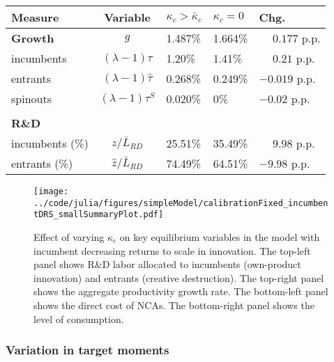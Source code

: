 \documentclass[ecta,nameyear,final]{econsocart}
\theoremstyle{definition}
\begin{document}
\begin{table}[]
	\centering
	\label{reducing_kappa_c_decomposition_table_incumbentRDS}
	\begin{tabular}{lclll}
		\toprule \toprule
		Measure & Variable & $\kappa_c > \bar{\kappa}_c$ & $\kappa_c = 0$ & Chg. \tabularnewline
		\midrule
		\textbf{Growth} & $g$ & 1.487\% & 1.664\% & $\phantom{-}0.177$ p.p.\tabularnewline
		\multicolumn{1}{l}{\quad incumbents} & $(\lambda -1) \tau$  & 1.20\% & 1.41\% & $\phantom{-}0.21$ p.p. \tabularnewline
		\multicolumn{1}{l}{\quad entrants} & $(\lambda -1) \hat{\tau}$ & 0.268\% & 0.249\% & $-0.019$ p.p. \tabularnewline
		\multicolumn{1}{l}{\quad spinouts} & $(\lambda -1) \tau^S$ & 0.020\% & 0\% & $-0.02$ p.p. \tabularnewline
		\tabularnewline
		\textbf{R\&D} & & & & 
		\tabularnewline
		\multicolumn{1}{l}{\quad incumbents (\%)}  & $z / \bar{L}_{RD}$ & 25.51\% & 35.49\% & $\phantom{-} 9.98$ p.p. \tabularnewline 
		
		\multicolumn{1}{l}{\quad entrants (\%)}  & $\hat{z} / \bar{L}_{RD}$ & 74.49\% & 64.51\% & $-9.98$ p.p. \tabularnewline
		\bottomrule
	\end{tabular}
\end{table}


\begin{figure}[]
\centering
\texttt{[image: ../code/julia/figures/simpleModel/calibrationFixed\_incumbentDRS\_smallSummaryPlot.pdf]}
\caption{Effect of varying $\kappa_c$ on key equilibrium variables in the model with incumbent decreasing returns to scale in innovation. The top-left panel shows R\&D labor allocated to incumbents (own-product innovation) and entrants (creative destruction). The top-right panel shows the aggregate productivity growth rate. The bottom-left panel shows the direct cost of NCAs. The bottom-right panel shows the level of consumption.}
\label{calibration_incumbentDRS_summaryPlot}
\end{figure}





\subsubsection{Variation in target moments}
\end{document}
